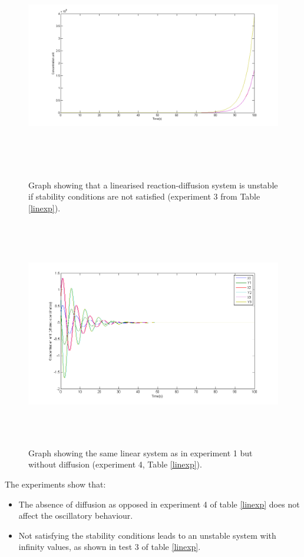 \begin{figure}
\centering
\includegraphics[width=15cm, height=10cm]{l3.png}
\caption{Graph showing that a linearised reaction-diffusion system is unstable if stability conditions are not satisfied (experiment 3 from Table \ref{linexp}).}
\label{l3}
\end{figure}

\begin{figure}
\centering
\includegraphics[width=15cm, height=10cm]{l4.png}
\caption{Graph showing the same linear system as in experiment 1 but without diffusion (experiment 4, Table \ref{linexp}).}
\label{l4}
\end{figure}

The experiments show that:
\begin{itemize}
\item The absence of diffusion as opposed in experiment 4 of table \ref{linexp} does not affect the oscillatory behaviour.
\item Not satisfying the stability conditions leads to an unstable system with infinity values, as shown in test 3 of table \ref{linexp}.
\end{itemize}

